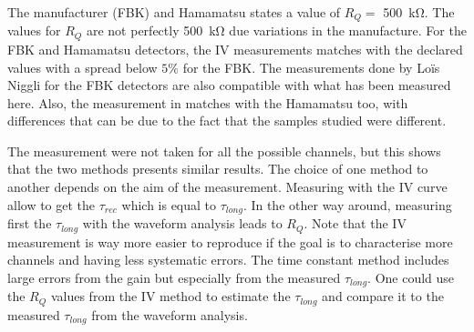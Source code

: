 The manufacturer (FBK) \cite{StefanoMerzi2023PrivateCommunication} and Hamamatsu states a value of $R_Q = $ \SI{500}{\kilo \ohm}. 
The values for $R_Q$ are not perfectly \SI{500}{\kilo \ohm} due variations in the manufacture. For the FBK and Hamamatsu detectors, the IV measurements matches with the declared values with a spread below $5\%$ for the FBK. 
The measurements done by Loïs Niggli for the FBK detectors %
\cite{NiggliLoisSECTIONIrradiation} are also compatible with what has been measured here. Also, the measurement in \cite{Girard2018CharacterisationDistributions} matches with the Hamamatsu too, with differences that can be due to the fact that the samples studied were different. 

The measurement were not taken for all the possible channels, but this shows that the two methods presents similar results. The choice of one method to another depends on the aim of the measurement. Measuring with the IV curve allow to get the $\tau_{rec}$ which is equal to $\tau_{long}$. In the other way around, measuring first the $\tau_{long}$ with the waveform analysis leads to $R_Q$. Note that the IV measurement is way more easier to reproduce if the goal is to characterise more channels and having less systematic errors. The time constant method includes large errors from the gain but especially from the measured $\tau_{long}$. One could use the $R_Q$ values from the IV method to estimate the $\tau_{long}$ and compare it to the measured $\tau_{long}$ from the waveform analysis. 


